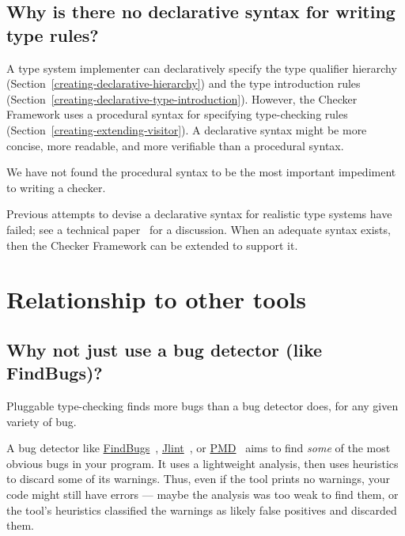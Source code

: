 \subsection{Why is there no declarative syntax for writing type rules?\label{faq-declarative-syntax-for-type-rules}}

A type system implementer can declaratively specify the type qualifier
hierarchy (Section~\ref{creating-declarative-hierarchy}) and the type introduction rules
(Section~\ref{creating-declarative-type-introduction}).  However, the Checker
Framework uses a procedural syntax for specifying type-checking
rules (Section~\ref{creating-extending-visitor}).
A declarative syntax might be more concise, more readable, and more
verifiable than a procedural syntax.

We have not found the procedural syntax to be the most important impediment
to writing a checker.

Previous attempts to devise a declarative syntax
for realistic type systems have failed; see a technical
paper~\cite{PapiACPE2008} for a discussion.  When an
adequate syntax exists, then the Checker Framework can be extended to
support it.


\section{Relationship to other tools\label{faq-other-tools-section}}


\subsection{Why not just use a bug detector (like FindBugs)?\label{faq-type-checking-vs-bug-detectors}}

Pluggable type-checking finds more bugs than a bug detector does, for any
given variety of bug.

A bug detector like \href{http://findbugs.sourceforge.net/}{FindBugs}~\cite{HovemeyerP2004,HovemeyerSP2005},
\href{http://jlint.sourceforge.net/}{Jlint}~\cite{Artho2001}, or
\href{http://pmd.sourceforge.net/}{PMD}~\cite{Copeland2005} aims to find \emph{some}
of the most obvious bugs in your program.  It uses a lightweight analysis,
then uses heuristics to discard some of its warnings.  Thus, even if the tool
prints no warnings, your code might still have errors --- maybe the
analysis was too weak to find them, or the tool's heuristics classified the
warnings as likely false positives and discarded them.

